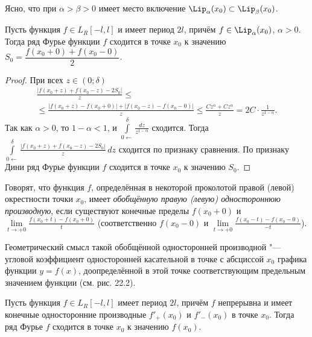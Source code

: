 \begin{notion}
Ясно, что при $\alpha > \beta > 0$ имеет место включение $\Lip_\alpha(x_0) \subset \Lip_\beta(x_0)$.
\end{notion}

\begin{thm}
Пусть функция $f \in L_R[-l, l]$ и имеет период $2l$, причём $f \in \Lip_\alpha(x_0)$, $\alpha > 0$. Тогда ряд Фурье функции $f$ сходится в точке $x_0$ к значению $S_0 = \dfrac{f(x_0 + 0) + f(x_0 - 0)}{2}$.
\end{thm}

\begin{proof}
При всех $z \in (0; \delta)$
\begin{multline*}
\frac{|f(x_0 + z) + f(x_0 - z) - 2 S_0|} {z} \le \\
\le \frac{|f(x_0 + z) - f(x_0 + 0)| + |f(x_0 - z) - f(x_0 - 0)|}{z} \le \frac{C z^\alpha + C z^\alpha}{z} = 2C \cdot \frac{1}{z^{1 - \alpha}}.
\end{multline*}
Так как $\alpha > 0$, то $1 - \alpha < 1$, и $\int\limits_{0\leftarrow}^{\delta} \frac{dz}{z^{1 - \alpha}}$ сходится. Тогда $\int\limits_{0\leftarrow}^{\delta} \frac{|f(x_0 + z) + f(x_0 - z) - 2 S_0|}{z}\,dz$ сходится по признаку сравнения. По признаку Дини ряд Фурье функции $f$ сходится в точке $x_0$ к значению $S_0$.
\end{proof}

\begin{defn}
Говорят, что функция $f$, определённая в некоторой проколотой правой (левой) окрестности точки $x_0$, имеет \textit{обобщённую правую (левую) одностороннюю производную}, если существуют конечные пределы $f(x_0 + 0)$ и $\lim\limits_{t \to +0} \frac{f(x_0 + t) - f(x_0 + 0)}{t}$ (соответственно $f(x_0 - 0)$ и $\lim\limits_{t \to +0} \frac{f(x_0 - t) - f(x_0 - 0)}{-t}$).
\end{defn}

Геометрический смысл такой обобщённой односторонней производной "--- угловой коэффициент односторонней касательной в точке с абсциссой $x_0$ графика функции $y = f(x)$, доопределённой в этой точке соответствующим предельным значением функции (см. рис. 22.2).

\begin{cons}
Пусть функция $f \in L_R[-l, l]$ имеет период $2l$, причём $f$ непрерывна и имеет конечные односторонние производные $f'_+(x_0)$ и $f'_-(x_0)$ в точке $x_0$. Тогда ряд Фурье $f$ сходится в точке $x_0$ к значению $f(x_0)$.
\end{cons}

